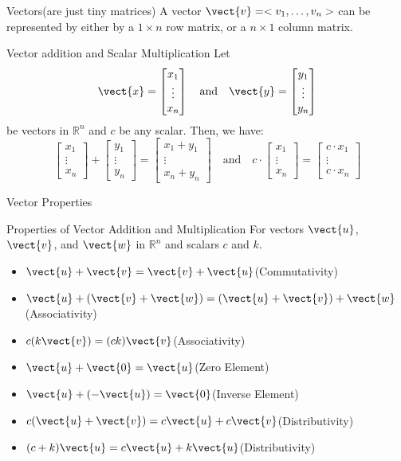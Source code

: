\documentclass{beamer}
\begin{document}
\begin{frame}{Vectors}{(are just tiny matrices)}
A vector $\vect{v}=< v_1,\dots,v_n >$ can be represented by either by a $1\times n$ row matrix, or a $n\times 1$ column matrix.\pause
\begin{block}{Vector addition and Scalar Multiplication}
Let
\[
\vect{x}=\begin{bmatrix}x_1\\\vdots\\x_n\end{bmatrix}
\quad\text{and}\quad
\vect{y}=\begin{bmatrix}y_1\\\vdots\\y_n\end{bmatrix}
\]
be vectors in  $\mathbb{R}^n$ and $c$ be any scalar. Then, we have:
\[
\begin{bmatrix}x_1\\\vdots\\x_n\end{bmatrix}+
\begin{bmatrix}y_1\\\vdots\\y_n\end{bmatrix}=
\begin{bmatrix}x_1+y_1\\\vdots\\x_n+y_n\end{bmatrix}
\quad\text{and}\quad
c\cdot\begin{bmatrix}x_1\\\vdots\\x_n\end{bmatrix}=
\begin{bmatrix} c\cdot x_1\\\vdots\\ c\cdot x_n\end{bmatrix}
\]
\end{block}
\end{frame}

\begin{frame}{Vector Properties}
\begin{block}{Properties of Vector Addition and Multiplication}
For vectors $\vect{u}$, $\vect{v}$, and $\vect{w}$ in $\mathbb{R}^n$ and scalars $c$ and $k$.\begin{itemize}
\item $\vect{u}+\vect{v}=\vect{v}+\vect{u}$\hfill(Commutativity)
\item $\vect{u}+(\vect{v}+\vect{w})=(\vect{u}+\vect{v})+\vect{w}$\hfill(Associativity)
\item $c(k\vect{v})=(ck)\vect{v}$\hfill(Associativity)
\item $\vect{u}+\vect{0}=\vect{u}$\hfill(Zero Element)
\item $\vect{u}+(-\vect{u})=\vect{0}$\hfill(Inverse Element)
\item $c(\vect{u}+\vect{v})=c\vect{u}+c\vect{v}$\hfill(Distributivity)
\item $(c+k)\vect{u}=c\vect{u}+k\vect{u}$\hfill(Distributivity)
\end{itemize}
\end{block}
\end{frame}
\end{document}
